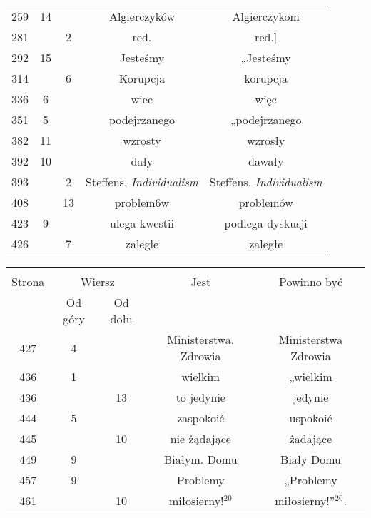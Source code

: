 \documentclass[a4paper,11pt]{article}
\begin{document}
\begin{center}
\begin{tabular}{|c|c|c|c|c|}
    259 & 14 & & Algierczyków & Algierczykom \\
    281 & &  2 & red. & red.] \\
    292 & 15 & & Jesteśmy & „Jesteśmy \\
    314 & &  6 & Korupcja & korupcja \\
    336 &  6 & & wiec & więc \\
    351 &  5 & & podejrzanego & „podejrzanego \\
    382 & 11 & & wzrosty & wzrosły \\
    392 & 10 & & dały & dawały \\
    393 & &  2 & Steffens,{ }{ }\emph{Individualism}
           & Steffens, \emph{Individualism} \\
    408 & & 13 & problem6w & problemów \\
    423 &  9 & & ulega kwestii & podlega dyskusji \\
    426 & &  7 & zalegle & zaległe \\
    \hline
  \end{tabular}



  \begin{tabular}{|c|c|c|c|c|}
    \hline
    & \multicolumn{2}{c|}{} & & \\
    Strona & \multicolumn{2}{c|}{Wiersz} & Jest
                              & Powinno być \\ \cline{2-3}
    & Od góry & Od dołu & & \\
    \hline
    427 &  4 & & Ministerstwa. Zdrowia & Ministerstwa Zdrowia \\
    436 &  1 & & wielkim & „wielkim \\
    436 & & 13 & to jedynie & jedynie \\
    444 &  5 & & zaspokoić & uspokoić \\
    445 & & 10 & nie żądające & żądające \\
    449 &  9 & & Białym. Domu & Biały Domu \\
    457 &  9 & & Problemy & „Problemy \\
    461 & & 10 & miłosierny!$^{ 20 }$ & miłosierny!”$^{ 20 }$. \\
    \hline
  \end{tabular}




\end{center}
\end{document}
